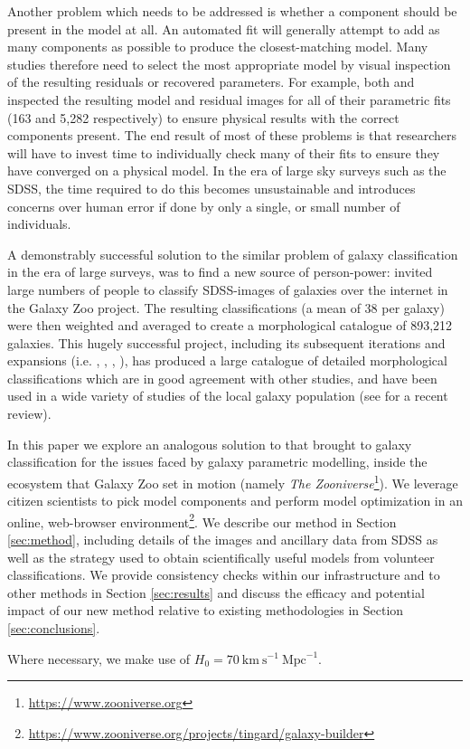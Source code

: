 \documentclass[../main.tex]{subfiles}
\begin{document}
Another problem which needs to be addressed is whether a component should be present in the model at all. An automated fit will generally attempt to add as many components as possible to produce the closest-matching model. Many studies therefore need to select the most appropriate model by visual inspection of the resulting residuals or recovered parameters. For example, both \citet{Vika2014:1408.4070v1} and \citet{2018MNRAS.473.4731K} inspected the resulting model and residual images for all of their parametric fits (163 and 5,282 respectively) to ensure physical results with the correct components present. The end result of most of these problems is that researchers will have to invest time to individually check many of their fits to ensure they have converged on a physical model. In the era of large sky surveys such as the SDSS, the time required to do this becomes unsustainable and introduces concerns over human error if done by only a single, or small number of individuals.

A demonstrably successful solution to the similar problem of galaxy classification in the era of large surveys, was to find a new source of person-power: \cite{Lintott2008:0804.4483v1} invited large numbers of people to classify SDSS-images of galaxies over the internet in the Galaxy Zoo project. The resulting classifications (a mean of 38 per galaxy) were then weighted and averaged to create a morphological catalogue of 893,212 galaxies. This hugely successful project, including its subsequent iterations and expansions (i.e. \citealt{Willett2013:1308.3496v2}, \citealt{Hart2016:1607.01019v1}, \citealt{2017MNRAS.464.4176W}, \citealt{2017MNRAS.464.4420S}), has produced a large catalogue of detailed morphological classifications which are in good agreement with other studies, and have been used in a wide variety of studies of the local galaxy population (see \citealt{2019arXiv191008177M} for a recent review).

In this paper we explore an analogous solution to that \citet{Lintott2008:0804.4483v1} brought to galaxy classification for the issues faced by galaxy parametric modelling, inside the ecosystem that Galaxy Zoo set in motion (namely {\it The Zooniverse}\footnote{\url{https://www.zooniverse.org}}). We leverage citizen scientists to pick model components and perform model optimization in an online, web-browser environment\footnote{\url{https://www.zooniverse.org/projects/tingard/galaxy-builder}}. We describe our method in Section \ref{sec:method}, including details of the images and ancillary data from SDSS as well as the strategy used to obtain scientifically useful models from volunteer classifications. We provide consistency checks within our infrastructure and to other methods in Section \ref{sec:results} and discuss the efficacy and potential impact of our new method relative to existing methodologies in Section \ref{sec:conclusions}.

Where necessary, we make use of $H_0 = 70\ \text{km}\ \text{s}^{-1}\ \text{Mpc}^{-1}$.
\end{document}
